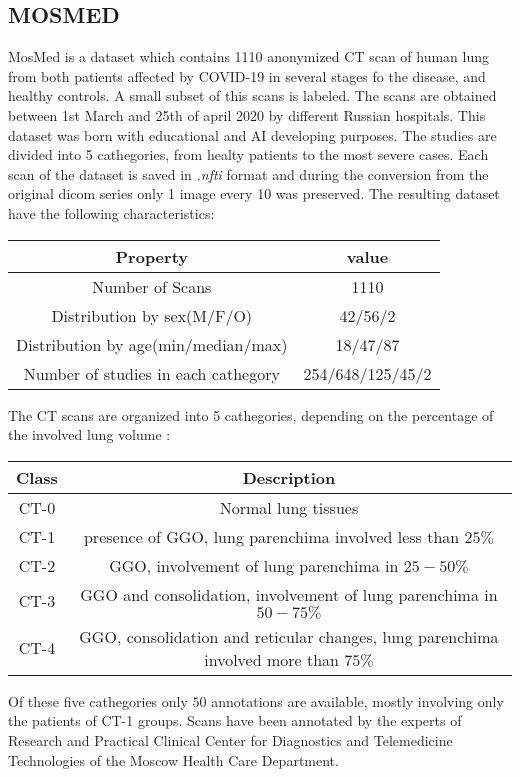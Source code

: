 \documentclass{standalone}
\begin{document}
	\subsection{MOSMED}
	
	MosMed is a dataset which contains 1110 anonymized CT scan of human lung from both patients affected by COVID-19 in several stages fo the disease, and healthy controls. A small subset of this scans is labeled. The scans are obtained between 1st March and 25th of april 2020 by different Russian hospitals. This dataset was born with educational and AI developing purposes. The studies are divided into 5 cathegories, from healty patients to the most severe cases. Each scan of the dataset is saved in \emph{.nfti} format and during the conversion from the original dicom series only 1 image every 10 was preserved.
	The resulting dataset have the following characteristics: 
	
	\begin{table}[h!]
		\centering
		\begin{tabular}{|c|c|}
			\hline
			\textbf{Property} 		   				   & \textbf{value}	  \\ \hline
			Number of Scans 		   				   & 1110             \\ 
			Distribution by sex(M/F/O) 				   & 42/56/2          \\
			Distribution by age(min/median/max)		   & 18/47/87         \\
			Number of studies in each cathegory		   & 254/648/125/45/2 \\ \hline
			
		\end{tabular}
	\end{table}

	The CT scans are organized into 5 cathegories, depending on the percentage of the involved lung volume : 
	\begin{table}[h!]
		\centering
		\begin{tabular}{|c|c|}
			\hline
			\textbf{Class} & \textbf{Description} \\ \hline
			CT-0		   & Normal  lung tissues \\
			CT-1		   & presence of GGO, lung parenchima involved less than $25\%$ \\
			CT-2		   & GGO, involvement of lung parenchima in $25 - 50\%$ \\
			CT-3		   & GGO and consolidation, involvement of lung parenchima in $50 - 75\%$ \\
			CT-4		   & GGO, consolidation and reticular changes, lung parenchima involved more than $75\%$\\ \hline
		\end{tabular}
	\end{table}

	Of these five cathegories only $50$ annotations are available, mostly involving only the patients of CT-1 groups. Scans have been annotated by the experts of Research and Practical Clinical Center for Diagnostics and Telemedicine Technologies of the Moscow Health Care Department.
\end{document}
